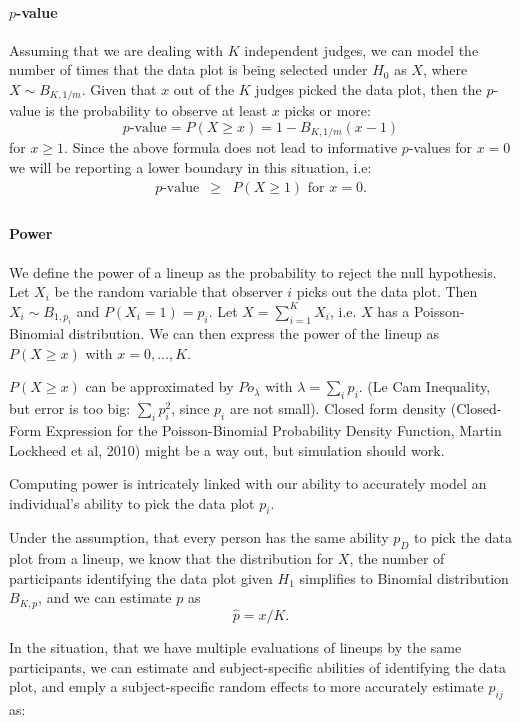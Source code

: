 \documentclass[11pt]{article}
\begin{document}
\paragraph{$p$-value}
Assuming that we are dealing with $K$ independent judges, we can model the number of times that the data plot is being selected under $H_0$ as $X$, where $X \sim B_{K, 1/m}$. Given that $x$ out of the $K$ judges picked the data plot, then  the $p$-value is the probability to observe at least $x$ picks or more:
\[
p\text{-value}  =  P(X \ge x) = 1 - B_{K, 1/m} (x-1)
\]
for $x \ge 1$.
Since the above formula does not lead to informative $p$-values for  $x=0$ we will be reporting a lower boundary in this situation, i.e:
\begin{eqnarray*}
p\text{-value} &\ge& P(X \ge 1) \text{ for } x= 0.\\
\end{eqnarray*}

\paragraph{Power}
We define the power of a lineup as the probability to reject the null hypothesis. Let $X_i$ be the random variable that observer $i$ picks out the data plot. Then $X_i \sim B_{1, p_i}$ and $P(X_i = 1) = p_i$. Let $X = \sum_{i=1}^K X_i$, i.e. $X$ has a Poisson-Binomial distribution.
We can then express the power of the lineup as $P(X \ge x)$ with $x = 0, ..., K$.

$P(X \ge x)$ can be approximated by $Po_\lambda$ with $\lambda= \sum_i p_i$. (Le Cam Inequality, but error is too big: $\sum_i p_i^2$, since $p_i$ are not small). Closed form density (Closed-Form Expression for the Poisson-Binomial Probability Density Function, Martin Lockheed et al, 2010) might be a way out, but simulation should work. 

Computing power  is intricately linked with our ability to accurately model an individual's ability to pick the data plot $p_i$.

Under the assumption, that every person has the same ability $p_D$ to pick the data plot from a lineup, we know that the distribution for $X$, the number of participants identifying the data plot given $H_1$  simplifies to  Binomial distribution $B_{K, p}$, and we can estimate $p$ as
\[
\hat{p} = x/K.
\] 


In the situation, that we have multiple evaluations of lineups by the same participants, we can estimate and subject-specific abilities of identifying the data plot, and emply a subject-specific random effects to more accurately estimate $p_{ij}$ as: 
\end{document}

